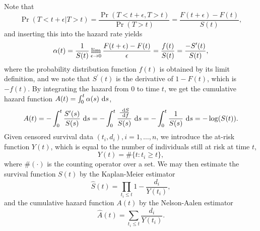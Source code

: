 Note that
\begin{equation*}
    \Pr(T<t+\epsilon|T>t)=\frac{\Pr(T<t+\epsilon,T>t)}{\Pr(T>t)}=\frac{F(t+\epsilon)-F(t)}{S(t)},
\end{equation*}
and inserting this into the hazard rate yields
\begin{equation}
\label{eq:hfs}
    \alpha(t)=\frac{1}{S(t)}\lim_{\epsilon\to0}\frac{F(t+\epsilon)-F(t)}{\epsilon}=\frac{f(t)}{S(t)}=\frac{-S^\prime(t)}{S(t)},
\end{equation}
where the probability distribution function $f(t)$ is obtained by its limit definition, and we note that $S^\prime(t)$ is the derivative of $1-F(t)$, which is $-f(t)$. By integrating the hazard from 0 to time $t$, we get the cumulative hazard function $A(t)=\int_0^t\alpha(s)~\text{d} s$,
\begin{equation}\label{eq:cumulative-hazard}
    A(t)=-\int_0^t\frac{S^\prime(s)}{S(s)}~\text{d} s=-\int_0^t\frac{\frac{~\text{d} S}{~\text{d} f}}{S(s)}~\text{d} s=-\int_0^t\frac{1}{S(s)}~\text{d} s=-\log(S(t)).
\end{equation}
Given censored survival data $(t_i,d_i),i=1,\ldots,n$, we introduce the at-risk function $Y(t)$, which is equal to the number of individuals still at risk at time $t$,
\begin{equation*}
    Y(t)=\#\{t\colon t_i\geq t\},
\end{equation*}
where $\#(\cdot)$ is the counting operator over a set. We may then estimate the survival function $S(t)$ by the Kaplan-Meier estimator
\begin{equation*}
    \hat{S}(t)=\prod_{t_i\leq t}1-\frac{d_i}{Y(t_i)},
\end{equation*}
and the cumulative hazard function $A(t)$ by the Nelson-Aalen estimator
\begin{equation*}
    \hat{A}(t)=\sum_{t_i\leq t}\frac{d_i}{Y(t_i)}.
\end{equation*}

